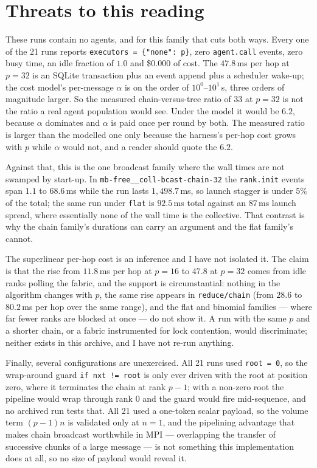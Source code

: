 \documentclass[11pt]{article}
\begin{document}
\section{Threats to this reading}

These runs contain no agents, and for this family that cuts both ways. Every one of the 21
runs reports \texttt{executors = \{"none": p\}}, zero \texttt{agent.call} events, zero busy
time, an idle fraction of $1.0$ and \$0.000 of cost. The $47.8$\,ms per hop at $p=32$ is an
SQLite transaction plus an event append plus a scheduler wake-up; the cost model's per-message
$\alpha$ is on the order of $10^0$--$10^1$\,s, three orders of magnitude larger. So the
measured chain-versus-tree ratio of $33$ at $p=32$ is not the ratio a real agent population
would see. Under the model it would be $6.2$, because $\alpha$ dominates and $\alpha$ is paid
once per round by both. The measured ratio is larger than the modelled one only because the
harness's per-hop cost grows with $p$ while $\alpha$ would not, and a reader should quote the
$6.2$.

Against that, this is the one broadcast family where the wall times are not swamped by
start-up. In \texttt{mb-free\_\_coll-bcast-chain-32} the \texttt{rank.init} events span $1.1$
to $68.6$\,ms while the run lasts $1{,}498.7$\,ms, so launch stagger is under $5\%$ of the
total; the same run under \texttt{flat} is $92.5$\,ms total against an $87$\,ms launch spread,
where essentially none of the wall time is the collective. That contrast is why the chain
family's durations can carry an argument and the flat family's cannot.

The superlinear per-hop cost is an inference and I have not isolated it. The claim is that the
rise from $11.8$\,ms per hop at $p=16$ to $47.8$ at $p=32$ comes from idle ranks polling the
fabric, and the support is circumstantial: nothing in the algorithm changes with $p$, the same
rise appears in \texttt{reduce/chain} (from $28.6$ to $80.2$\,ms per hop over the same range),
and the flat and binomial families --- where far fewer ranks are blocked at once --- do not
show it. A run with the same $p$ and a shorter chain, or a fabric instrumented for lock
contention, would discriminate; neither exists in this archive, and I have not re-run
anything.

Finally, several configurations are unexercised. All 21 runs used \texttt{root = 0}, so the
wrap-around guard \texttt{if nxt != root} is only ever driven with the root at position zero,
where it terminates the chain at rank $p-1$; with a non-zero root the pipeline would wrap
through rank $0$ and the guard would fire mid-sequence, and no archived run tests that. All 21
used a one-token scalar payload, so the volume term $(p-1)n$ is validated only at $n=1$, and
the pipelining advantage that makes chain broadcast worthwhile in MPI --- overlapping the
transfer of successive chunks of a large message --- is not something this implementation does
at all, so no size of payload would reveal it.
\end{document}
